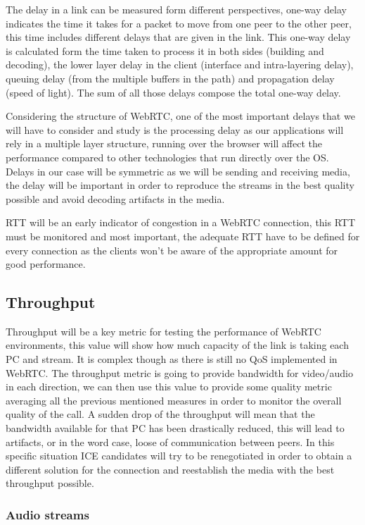 The delay in a link can be measured form different perspectives, one-way delay indicates the time it takes for a packet to move from one peer to the other peer, this time includes different delays that are given in the link. This one-way delay is calculated form the time taken to process it in both sides (building and decoding), the lower layer delay in the client (interface and intra-layering delay), queuing delay (from the multiple buffers in the path) and propagation delay (speed of light). The sum of all those delays compose the total one-way delay.

Considering the structure of WebRTC, one of the most important delays that we will have to consider and study is the processing delay as our applications will rely in a multiple layer structure, running over the browser will affect the performance compared to other technologies that run directly over the OS. Delays in our case will be symmetric as we will be sending and receiving media, the delay will be important in order to reproduce the streams in the best quality possible and avoid decoding artifacts in the media. 

RTT will be an early indicator of congestion in a WebRTC connection, this RTT must be monitored and most important, the adequate RTT have to be defined for every connection as the clients won't be aware of the appropriate amount for good performance.

\subsection{Throughput}

Throughput will be a key metric for testing the performance of WebRTC environments, this value will show how much capacity of the link is taking each PC and stream. It is complex though as there is still no QoS implemented in WebRTC. The throughput metric is going to provide bandwidth for video/audio in each direction, we can then use this value to provide some quality metric averaging all the previous mentioned measures in order to monitor the overall quality of the call. A sudden drop of the throughput will mean that the bandwidth available for that PC has been drastically reduced, this will lead to artifacts, or in the word case, loose of communication between peers. In this specific situation ICE candidates will try to be renegotiated in order to obtain a different solution for the connection and reestablish the media with the best throughput possible.

\subsubsection{Audio streams}

